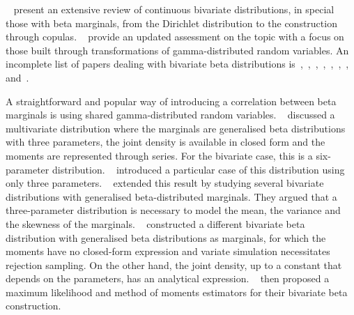 \documentclass[a4paper, notitlepage, 10pt]{article}
\theoremstyle{definition}
\begin{document}

~\cite{balakrishnan2009continuous} present an extensive review of continuous bivariate distributions, in special those with beta marginals, from the Dirichlet distribution to the construction through copulas.
~\cite{trick2021bivariate} provide an updated assessment on the topic with a focus on those built through transformations of gamma-distributed random variables.
An incomplete list of papers dealing with bivariate beta distributions is~\cite{libby1982multivariate},~\cite{olkin2003bivariate},~\cite{magnussen2004algorithm},~\cite{nadarajah2005some},~\cite{sarabia2006bivariate},~\cite{nadarajah2007new},~\cite{arnold2011flexible},~\cite{nadarajah_new_2017} and~\cite{trick2021bivariate}.

A straightforward and popular way of introducing a correlation between beta marginals is using shared gamma-distributed random variables. 
~\cite{libby1982multivariate} discussed a multivariate distribution where the marginals are generalised beta distributions with three parameters, the joint density is available in closed form and the moments are represented through series. 
For the bivariate case, this is a six-parameter distribution.
~\cite{olkin2003bivariate} introduced a particular case of this distribution using only three parameters.
~\cite{sarabia2006bivariate} extended this result by studying several bivariate distributions with generalised beta-distributed marginals.
They argued that a three-parameter distribution is necessary to model the mean, the variance and the skewness of the marginals.
~\cite{nadarajah2007new} constructed a different bivariate beta distribution with generalised beta distributions as marginals, for which the moments have no closed-form expression and variate simulation necessitates rejection sampling.
On the other hand, the joint density, up to a constant that depends on the parameters, has an analytical expression.
~\cite{nadarajah2007new} then proposed a maximum likelihood and method of moments estimators for their bivariate beta construction.
\end{document}
